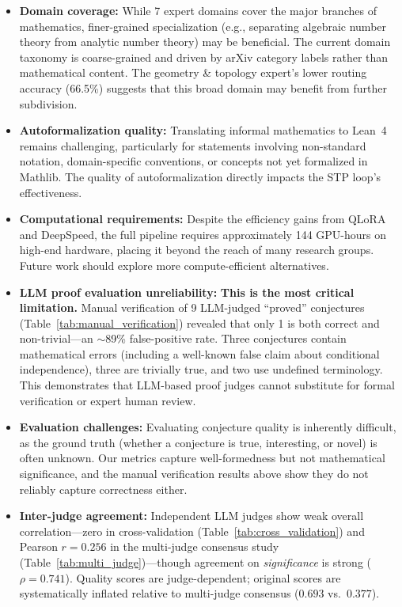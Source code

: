 \documentclass[11pt,a4paper]{article}
\begin{document}
\begin{itemize}[leftmargin=*]
    \item \textbf{Domain coverage:} While 7 expert domains cover the major branches of mathematics, finer-grained specialization (e.g., separating algebraic number theory from analytic number theory) may be beneficial. The current domain taxonomy is coarse-grained and driven by arXiv category labels rather than mathematical content. The geometry \& topology expert's lower routing accuracy (66.5\%) suggests that this broad domain may benefit from further subdivision.

    \item \textbf{Autoformalization quality:} Translating informal mathematics to Lean~4 remains challenging, particularly for statements involving non-standard notation, domain-specific conventions, or concepts not yet formalized in Mathlib. The quality of autoformalization directly impacts the STP loop's effectiveness.

    \item \textbf{Computational requirements:} Despite the efficiency gains from QLoRA and DeepSpeed, the full pipeline requires approximately 144 GPU-hours on high-end hardware, placing it beyond the reach of many research groups. Future work should explore more compute-efficient alternatives.

    \item \textbf{LLM proof evaluation unreliability:} \textbf{This is the most critical limitation.} Manual verification of 9 LLM-judged ``proved'' conjectures (Table~\ref{tab:manual_verification}) revealed that only 1 is both correct and non-trivial---an $\sim$89\% false-positive rate. Three conjectures contain mathematical errors (including a well-known false claim about conditional independence), three are trivially true, and two use undefined terminology. This demonstrates that LLM-based proof judges cannot substitute for formal verification or expert human review.

    \item \textbf{Evaluation challenges:} Evaluating conjecture quality is inherently difficult, as the ground truth (whether a conjecture is true, interesting, or novel) is often unknown. Our metrics capture well-formedness but not mathematical significance, and the manual verification results above show they do not reliably capture correctness either.

    \item \textbf{Inter-judge agreement:} Independent LLM judges show weak overall correlation---zero in cross-validation (Table~\ref{tab:cross_validation}) and Pearson $r = 0.256$ in the multi-judge consensus study (Table~\ref{tab:multi_judge})---though agreement on \emph{significance} is strong ($\rho = 0.741$). Quality scores are judge-dependent; original scores are systematically inflated relative to multi-judge consensus ($0.693$ vs.\ $0.377$).


\end{itemize}
\end{document}
